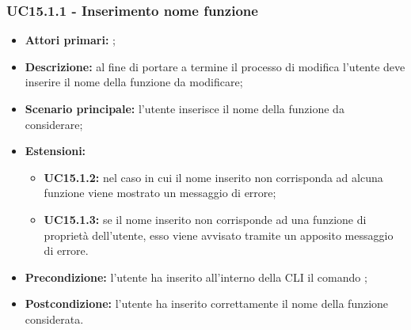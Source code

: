 \subsubsection{UC15.1.1 - Inserimento nome funzione }
\begin{itemize}
	\item \textbf{Attori primari:} \us{};
	\item \textbf{Descrizione:} al fine di portare a termine il processo di modifica l’utente deve inserire il nome della funzione da modificare;
	\item \textbf{Scenario principale:} l’utente inserisce il nome della funzione da considerare; 
	\item \textbf{Estensioni:} 
	\begin{itemize}
		\item \textbf{UC15.1.2:} nel caso in cui il nome inserito non corrisponda ad alcuna funzione viene mostrato un messaggio di errore; 
		\item \textbf{UC15.1.3:} se il nome inserito non corrisponde ad una funzione di proprietà dell'utente, esso viene avvisato tramite un apposito messaggio di errore.
	\end{itemize}
	\item \textbf{Precondizione:} l’utente ha inserito all’interno della CLI il comando \edit{};
	\item \textbf{Postcondizione:} l’utente ha inserito correttamente il nome della funzione considerata.
\end{itemize}